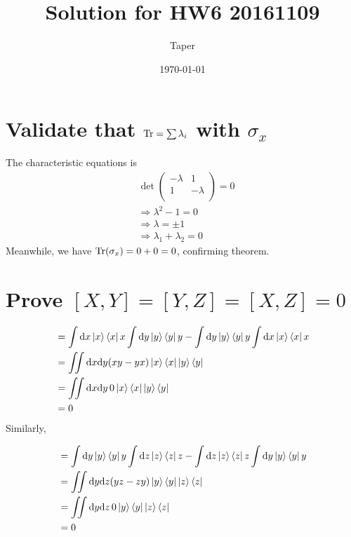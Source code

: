 \documentclass{article}
\title{Solution for HW6 20161109}
\date{\today}
\author{Taper}
\begin{document}
\maketitle
{}
\section{Validate that \texorpdfstring{$\operatorname{Tr}=\sum \lambda_i$ with
$\sigma_x$}{}}
The characteristic equations is
\begin{align*}
    &\det \left( \begin{array}{cc}
        -\lambda & 1 \\
        1 & -\lambda \\
    \end{array} \right) = 0 \\
    &\Rightarrow \lambda^2 -1 = 0 \\
    &\Rightarrow \lambda = \pm 1 \\
    &\Rightarrow \lambda_1 + \lambda_2 = 0
\end{align*}
Meanwhile, we have $\operatorname{Tr}(\sigma_x) = 0+0 = 0$, confirming theorem.

\section{Prove \texorpdfstring{$[X,Y]=[Y,Z]=[X,Z]=0$}{}}
\begin{align*}
    [X,Y] &= \int \dd x\ket{x}\bra{x} x \int \dd y\ket{y}\bra{y} y
        - \int \dd y\ket{y}\bra{y} y \int \dd x\ket{x}\bra{x} x \\
        &= \iint \dx\dy (xy - yx) \ket{x}\bra{x}\ket{y}\bra{y} \\
        &= \iint \dx\dy \, 0 \ket{x}\bra{x}\ket{y}\bra{y} \\
        &= 0
\end{align*}
Similarly,

\begin{align*}
    [Y,Z] &= \int \dd y\ket{y}\bra{y} y \int \dd z\ket{z}\bra{z} z
        - \int \dd z\ket{z}\bra{z} z \int \dd y\ket{y}\bra{y} y \\
        &= \iint \dy\dz (yz - zy) \ket{y}\bra{y}\ket{z}\bra{z} \\
        &= \iint \dy\dz \, 0 \ket{y}\bra{y}\ket{z}\bra{z} \\
        &= 0
\end{align*}
\end{document}
